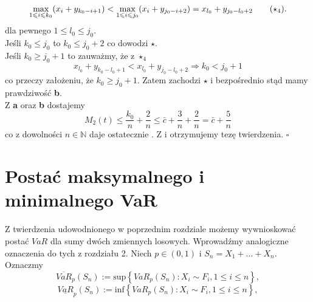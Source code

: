 \documentclass[12pt,a4paper,openany]{book}
\newcommand*{\QEDB}{\hfill\ensuremath{\square}}
\newcommand{\RomanNumeralCaps}[1]
    {\MakeUppercase{\romannumeral #1}}
\begin{document}
\begin{equation}
\underset{1 \leqslant i \leqslant k_{0}}{\textnormal{max}}(x_{i} + y_{k_{0} - i + 1}) < \underset{1 \leqslant i \leqslant j_{0}}{\textnormal{max}}(x_{i} + y_{j_{0} - i + 2}) = x_{l_{0}} + y_{j_{0} - l_{0} + 2} \tag{$\star_{4}$}.
\end{equation}
dla pewnego $1 \leqslant l_{0} \leqslant j_{0}$.\\
\noindent Jeśli $k_{0} \leqslant j_{0}$ to $k_{0} \leqslant j_{0} + 2$ co dowodzi $\star$.\\
\noindent Jeśli $k_{0} \geqslant j_{0} + 1$ to zauważmy, że z $\star_{4}$
\begin{equation}
x_{l_{0}} + y_{k_{0} - l_{0} + 1} < x_{l_{0}} + y_{j_{0} - l_{0} + 2} \Rightarrow k_{0} < j_{0} + 1 \nonumber
\end{equation}
co przeczy założeniu, że $k_{0} \geqslant j_{0} + 1$. Zatem zachodzi $\star$ i bezpośrednio stąd mamy prawdziwość \textbf{\RomanNumeralCaps{2}b}.\\
\noindent Z \textbf{\RomanNumeralCaps{2}a} oraz \textbf{\RomanNumeralCaps{2}b} dostajemy
\begin{equation}
M_{2}(t) \leqslant \dfrac{k_{0}}{n} + \dfrac{2}{n} \leqslant \bar c + \dfrac{3}{n}+ \dfrac{2}{n} = \bar c + \dfrac{5}{n}
\end{equation}
co z dowolności $n \in \mathbb{N}$ daje ostatecznie \textbf{\RomanNumeralCaps{2}}. Z \textbf{\RomanNumeralCaps{1}} i \textbf{\RomanNumeralCaps{2}} otrzymujemy tezę twierdzenia.
 \phantom{1} \hfill \QEDB

\section{Postać maksymalnego i minimalnego VaR}

Z twierdzenia udowodnionego w poprzednim rozdziale możemy wywnioskować postać $VaR$ dla sumy dwóch zmiennych losowych. Wprowadźmy analogiczne oznaczenia do tych z rozdziału 2. Niech $p \in (0,1)$ i $S_{n} = X_{1} + ... + X_{n}$. Oznaczmy
\begin{equation}
\overline{VaR}_{p}(S_{n}) := \text{sup} \left\lbrace  VaR_{p}\left(S_{n}\right): X_{i} \sim F_{i}, 1 \leqslant i \leqslant n \right\rbrace,
\end{equation}
\begin{equation}
\underline{VaR}_{p}(S_{n}) := \text{inf} \left\lbrace  VaR_{p}\left(S_{n}\right): X_{i} \sim F_{i}, 1 \leqslant i \leqslant n \right\rbrace,
\end{equation}
\end{document}
